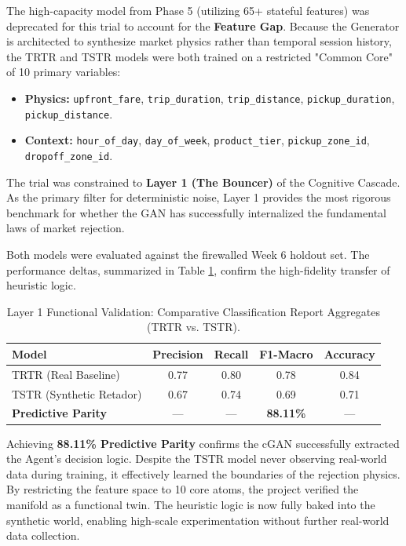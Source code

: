 The high-capacity model from Phase 5 (utilizing 65+ stateful features) was deprecated for this trial to account for the \textbf{Feature Gap}. Because the Generator is architected to synthesize market physics rather than temporal session history, the TRTR and TSTR models were both trained on a restricted "Common Core" of 10 primary variables:

\begin{itemize}[noitemsep, topsep=3pt]
    \item \textbf{Physics:} \texttt{upfront\_fare}, \texttt{trip\_duration}, \texttt{trip\_distance}, \texttt{pickup\_duration}, \texttt{pickup\_distance}.
    \item \textbf{Context:} \texttt{hour\_of\_day}, \texttt{day\_of\_week}, \texttt{product\_tier}, \texttt{pickup\_zone\_id}, \texttt{dropoff\_zone\_id}.
\end{itemize}

The trial was constrained to \textbf{Layer 1 (The Bouncer)} of the Cognitive Cascade. As the primary filter for deterministic noise, Layer 1 provides the most rigorous benchmark for whether the GAN has successfully internalized the fundamental laws of market rejection.

Both models were evaluated against the firewalled Week 6 holdout set. The performance deltas, summarized in Table \ref{tab:parity_results}, confirm the high-fidelity transfer of heuristic logic.

\begin{table}[H]
    \centering
    \small
    \begin{tabularx}{0.8\textwidth}{l c c c c}
        \toprule
        \textbf{Model} & \textbf{Precision} & \textbf{Recall} & \textbf{F1-Macro} & \textbf{Accuracy} \\
        \midrule
        TRTR (Real Baseline) & 0.77 & 0.80 & 0.78 & 0.84 \\
        TSTR (Synthetic Retador) & 0.67 & 0.74 & 0.69 & 0.71 \\
        \midrule
        \textbf{Predictive Parity} & --- & --- & \textbf{88.11\%} & --- \\
        \bottomrule
    \end{tabularx}
    \caption{Layer 1 Functional Validation: Comparative Classification Report Aggregates (TRTR vs. TSTR).}
    \label{tab:parity_results}
\end{table}

Achieving \textbf{88.11\% Predictive Parity} confirms the cGAN successfully extracted the Agent's decision logic. Despite the TSTR model never observing real-world data during training, it effectively learned the boundaries of the rejection physics. By restricting the feature space to 10 core atoms, the project verified the manifold as a functional twin. The heuristic logic is now fully baked into the synthetic world, enabling high-scale experimentation without further real-world data collection.


